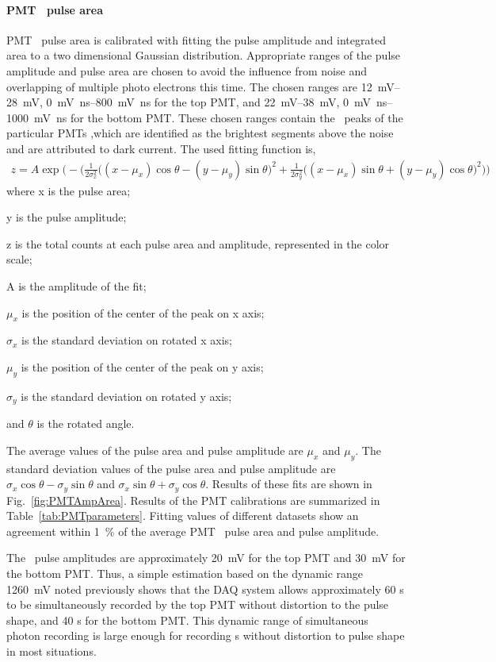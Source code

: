 \paragraph{PMT \sphe\ pulse area}
 PMT \sphe\ pulse area is calibrated with fitting the pulse amplitude and integrated area to a two dimensional Gaussian distribution. Appropriate ranges of the pulse amplitude and pulse area are chosen to avoid the influence from noise and overlapping of multiple photo electrons this time. The chosen ranges are \SIrange{12}{28}{\mV}, \SIrange{0}{800}{\mV\ns} for the top PMT, and \SIrange{22}{38}{\mV}, \SIrange{0}{1000}{\mV\ns} for the bottom PMT. These chosen ranges contain the \sphe\ peaks of the particular PMTs ,which are identified as the brightest segments above the noise and are attributed to dark current. The used fitting function is, 
 \begin{align}
 z = 	A \exp \bigg( -\Big(\frac{1}{2 \sigma_x^2} \big( (x-\mu_{x})\cos \theta - (y-\mu_y)\sin \theta \big) ^2 + \frac{1}{2 \sigma_y^2} \big( (x-\mu_{x})\sin \theta + (y-\mu_y)\cos \theta \big) ^2  \Big) \bigg)
 \end{align} 
where x is the pulse area; 

y is the pulse amplitude; 

z is the total counts at each pulse area and amplitude, represented in the color scale; 

A is the amplitude of the fit; 

$\mu_{x}$ is the position of the center of the peak on x axis; 

$\sigma_{x}$ is the standard deviation on rotated x axis; 

$\mu_{y}$ is the position of the center of the peak on y axis; 

$\sigma_{y}$ is the standard deviation on rotated y axis; 

and $\theta$ is the rotated angle.  

The average values of the pulse area and pulse amplitude are $\mu_{x}$ and $\mu_{y}$. The standard deviation values of the pulse area and pulse amplitude are $\sigma_{x} \cos \theta - \sigma_{y} \sin \theta$ and $\sigma_{x} \sin \theta + \sigma_{y} \cos \theta$. Results of these fits are shown in Fig.~\ref{fig:PMTAmpArea}. Results of the PMT calibrations are summarized in Table~\ref{tab:PMTparameters}. Fitting values of different datasets show an agreement within \SI{1}{\percent} of the average PMT \sphe\ pulse area and pulse amplitude. 

The \sphe\ pulse amplitudes are approximately \SI{20}{\mV} for the top PMT and \SI{30}{\mV} for the bottom PMT. Thus, a simple estimation based on the dynamic range \SI{1260}{\mV} noted previously shows that the DAQ system allows approximately 60 \sphe s to be simultaneously recorded by the top PMT without distortion to the pulse shape, and 40 \sphe s for the bottom PMT. This dynamic range of simultaneous photon recording is large enough for recording \ees s without distortion to pulse shape in most situations. 

